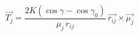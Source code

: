 \documentclass[12pt]{article}
\begin{document}
$$
\vec{T_j} = \frac{2K(\cos\gamma - \cos\gamma_0)}{\mu_j\,r_{ij}}\,
           \vec{r_{ij}} \times \vec{\mu_j}
$$
\end{document}
